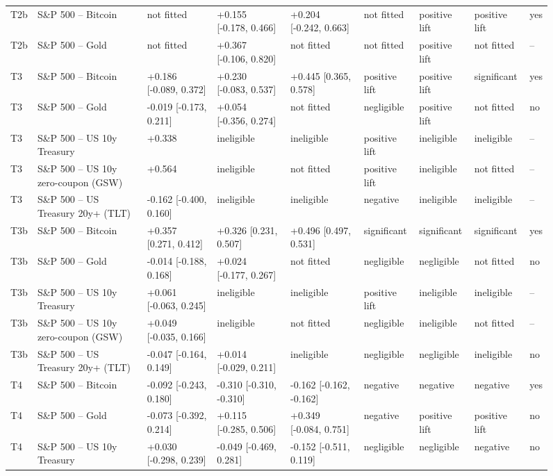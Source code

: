 \begin{figure}[t]
{\begin{tabular}{lllllllll}
T2b & S\&P 500 -- Bitcoin & not fitted & +0.155 [-0.178, 0.466] & +0.204 [-0.242, 0.663] & not fitted & positive lift & positive lift & yes \\
T2b & S\&P 500 -- Gold & not fitted & +0.367 [-0.106, 0.820] & not fitted & not fitted & positive lift & not fitted & -- \\
T3 & S\&P 500 -- Bitcoin & +0.186 [-0.089, 0.372] & +0.230 [-0.083, 0.537] & +0.445 [0.365, 0.578] & positive lift & positive lift & significant & yes \\
T3 & S\&P 500 -- Gold & -0.019 [-0.173, 0.211] & +0.054 [-0.356, 0.274] & not fitted & negligible & positive lift & not fitted & no \\
T3 & S\&P 500 -- US 10y Treasury & +0.338 & ineligible & ineligible & positive lift & ineligible & ineligible & -- \\
T3 & S\&P 500 -- US 10y zero-coupon (GSW) & +0.564 & ineligible & not fitted & positive lift & ineligible & not fitted & -- \\
T3 & S\&P 500 -- US Treasury 20y+ (TLT) & -0.162 [-0.400, 0.160] & ineligible & ineligible & negative & ineligible & ineligible & -- \\
T3b & S\&P 500 -- Bitcoin & +0.357 [0.271, 0.412] & +0.326 [0.231, 0.507] & +0.496 [0.497, 0.531] & significant & significant & significant & yes \\
T3b & S\&P 500 -- Gold & -0.014 [-0.188, 0.168] & +0.024 [-0.177, 0.267] & not fitted & negligible & negligible & not fitted & no \\
T3b & S\&P 500 -- US 10y Treasury & +0.061 [-0.063, 0.245] & ineligible & ineligible & positive lift & ineligible & ineligible & -- \\
T3b & S\&P 500 -- US 10y zero-coupon (GSW) & +0.049 [-0.035, 0.166] & ineligible & not fitted & negligible & ineligible & not fitted & -- \\
T3b & S\&P 500 -- US Treasury 20y+ (TLT) & -0.047 [-0.164, 0.149] & +0.014 [-0.029, 0.211] & ineligible & negligible & negligible & ineligible & no \\
T4 & S\&P 500 -- Bitcoin & -0.092 [-0.243, 0.180] & -0.310 [-0.310, -0.310] & -0.162 [-0.162, -0.162] & negative & negative & negative & yes \\
T4 & S\&P 500 -- Gold & -0.073 [-0.392, 0.214] & +0.115 [-0.285, 0.506] & +0.349 [-0.084, 0.751] & negative & positive lift & positive lift & no \\
T4 & S\&P 500 -- US 10y Treasury & +0.030 [-0.298, 0.239] & -0.049 [-0.469, 0.281] & -0.152 [-0.511, 0.119] & negligible & negligible & negative & no \\

\end{tabular}}
\end{figure}
